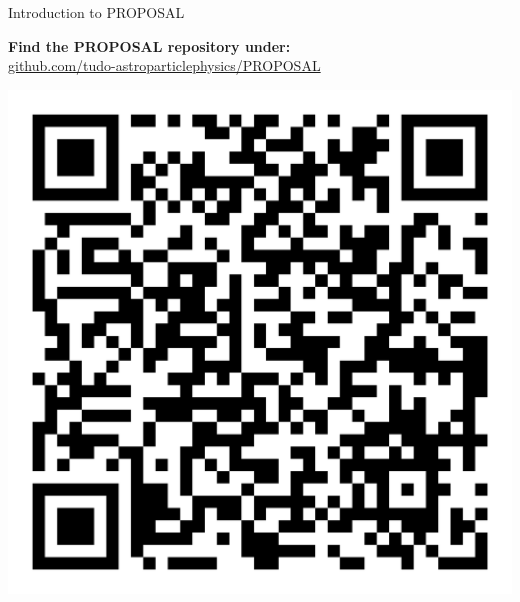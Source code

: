 \documentclass[t]{beamer}
\begin{document}
\begin{columns}[onlytextwidth]
\begin{column}{0.45\textwidth}
\begin{block}[equal height group=F]{Introduction to PROPOSAL}
      \vspace{0.8em}
              \begin{center}
                \colorbox{light-gray}{
            \begin{minipage}[ht]{0.75\linewidth}
              \begin{center}
              \textbf{Find the PROPOSAL repository under:}\\ \url{github.com/tudo-astroparticlephysics/PROPOSAL} %
              \end{center}
            \end{minipage}
            \begin{minipage}[ht]{0.24\linewidth}
              \centering
                \includegraphics[width=0.66\linewidth, valign=t]{plots/qr_proposal_transparent.png}
            \end{minipage}
                }
              \end{center}

      \end{block}%
    \end{column}%


\end{columns}
\end{document}
